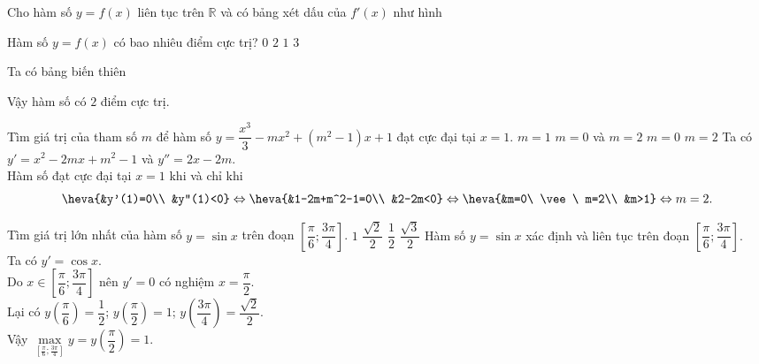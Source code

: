 \begin{ex}%
 Cho hàm số $y=f(x)$ liên tục trên $\mathbb{R}$ và có bảng xét dấu của $f'(x)$ như hình
 \begin{center}
 \end{center}
 Hàm số $y=f(x)$ có bao nhiêu điểm cực trị?
 \choice
  {$0$}
  {\True $2$}
  {$1$}
  {$3$}
 \loigiai
  {
  Ta có bảng biến thiên
  \begin{center}
  \end{center}
  Vậy hàm số có $2$ điểm cực trị.
  }
\end{ex}

\begin{ex}%
 Tìm giá trị của tham số $m$ để hàm số $y=\dfrac{x^3}{3}-mx^2+(m^2-1)x+1$ đạt cực đại tại $x=1$.
 \choice
  {$m=1$}
  {$m=0$ và $m=2$}
  {$m=0$}
  {\True $m=2$}
 \loigiai
  {
  Ta có 
  $y'=x^2-2mx+m^2-1$ và $y''=2x-2m$.\\
  Hàm số đạt cực đại tại $x=1$ khi và chỉ khi
  \[\heva{&y'(1)=0\\ &y''(1)<0}\Leftrightarrow\heva{&1-2m+m^2-1=0\\ &2-2m<0}\Leftrightarrow \heva{&m=0\ \vee\ m=2\\ &m>1}\Leftrightarrow m=2.\]
  }
\end{ex}

\begin{ex}%
 Tìm giá trị lớn nhất của hàm số $y=\sin x$ trên đoạn $\left[\dfrac{\pi}{6};\dfrac{3\pi}{4}\right]$.
 \choice
  {\True $1$}
  {$\dfrac{\sqrt{2}}{2}$}
  {$\dfrac{1}{2}$}
  {$\dfrac{\sqrt{3}}{2}$}
 \loigiai
  {
  Hàm số $y=\sin x$ xác định và liên tục trên đoạn $\left[\dfrac{\pi}{6};\dfrac{3\pi}{4}\right]$.\\
  Ta có $y'=\cos x$.\\
  Do $x\in \left[\dfrac{\pi}{6};\dfrac{3\pi}{4}\right]$ nên $y'=0$ có nghiệm $x=\dfrac{\pi}{2}$.\\
  Lại có $y\left(\dfrac{\pi}{6}\right)=\dfrac{1}{2}$; $y\left(\dfrac{\pi}{2}\right)=1$; $y\left(\dfrac{3\pi}{4}\right)=\dfrac{\sqrt{2}}{2}$.\\
  Vậy $\max\limits_{\left[\frac{\pi}{6};\frac{3\pi}{4}\right]} y=y\left(\dfrac{\pi}{2}\right)=1$.
  }
\end{ex}

